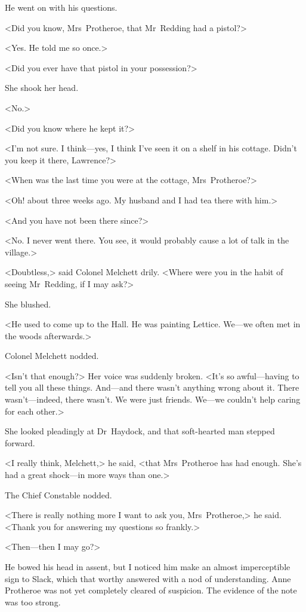 He went on with his questions.

<Did you know, Mrs~Protheroe, that Mr~Redding had a pistol?>

<Yes. He told me so once.>

<Did you ever have that pistol in your possession?>

She shook her head.

<No.>

<Did you know where he kept it?>

<I'm not sure. I think—yes, I think I've seen it on a shelf in his cottage. Didn't you keep it there, Lawrence?>

<When was the last time you were at the cottage, Mrs~Protheroe?>

<Oh! about three weeks ago. My husband and I had tea there with him.>

<And you have not been there since?>

<No. I never went there. You see, it would probably cause a lot of talk in the village.>

<Doubtless,> said Colonel Melchett drily. <Where were you in the habit of seeing Mr~Redding, if I may ask?>

She blushed.

<He used to come up to the Hall. He was painting Lettice. We—we often met in the woods afterwards.>

Colonel Melchett nodded.

<Isn't that enough?> Her voice was suddenly broken. <It's so awful—having to tell you all these things. And—and there wasn't anything wrong about it. There wasn't—indeed, there wasn't. We were just friends. We—we couldn't help caring for each other.>

She looked pleadingly at Dr~Haydock, and that soft-hearted man stepped forward.

<I really think, Melchett,> he said, <that Mrs~Protheroe has had enough. She's had a great shock—in more ways than one.>

The Chief Constable nodded.

<There is really nothing more I want to ask you, Mrs~Protheroe,> he said. <Thank you for answering my questions so frankly.>

<Then—then I may go?>

He bowed his head in assent, but I noticed him make an almost imperceptible sign to Slack, which that worthy answered with a nod of understanding. Anne Protheroe was not yet completely cleared of suspicion. The evidence of the note was too strong.

